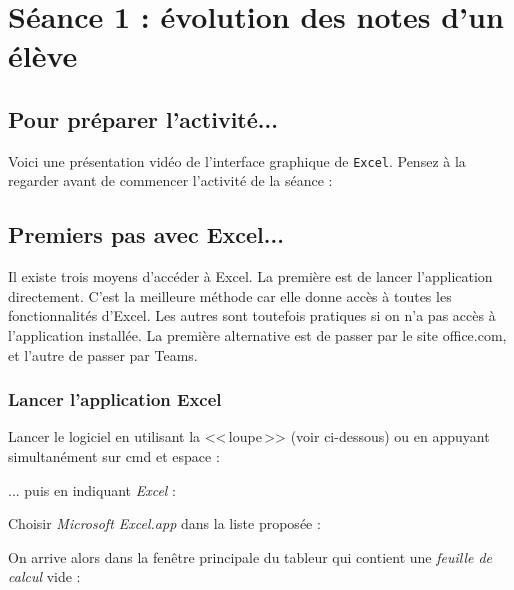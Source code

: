 \newpage


\section{Séance 1 : évolution des notes d'un élève}


\subsection{Pour préparer l'activité...}

Voici une présentation vidéo de l'interface graphique de \texttt{Excel}. Pensez à la regarder avant de commencer l'activité de la séance :

\begin{center}
\end{center}



\subsection{Premiers pas avec Excel...}

Il existe trois moyens d'accéder à Excel. La première est de lancer l'application directement. C'est la meilleure méthode car elle donne accès à toutes les fonctionnalités d'Excel. Les autres sont toutefois pratiques si on n'a pas accès à l'application installée. La première alternative est de passer par le site office.com, et l'autre de passer par Teams.

\subsubsection{Lancer l'application Excel}

Lancer le logiciel en utilisant la <<\,loupe\,>> (voir ci-dessous) ou en appuyant simultanément sur cmd et espace :


... puis en indiquant \emph{Excel} :


Choisir \emph{Microsoft Excel.app} dans la liste proposée :


On arrive alors dans la fenêtre principale du tableur qui contient une \emph{feuille de calcul} vide :

